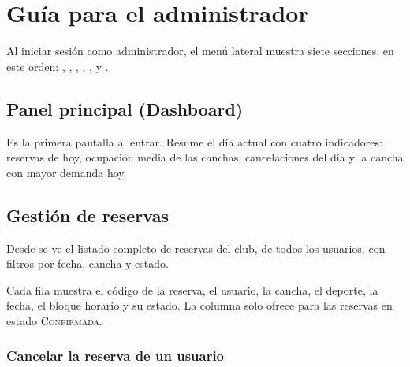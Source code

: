 
\section{Guía para el administrador}
\label{sec:administrador}

Al iniciar sesión como administrador, el menú lateral muestra siete
secciones, en este orden: , ,
, , ,
 y .


\subsection{Panel principal (Dashboard)}
\label{sec:admin:dashboard}

Es la primera pantalla al entrar. Resume el día actual con cuatro
indicadores: reservas de hoy, ocupación media de las canchas,
cancelaciones del día y la cancha con mayor demanda hoy.


\subsection{Gestión de reservas}
\label{sec:admin:reservas}

Desde  se ve el listado completo de reservas del club,
de todos los usuarios, con filtros por fecha, cancha y estado.


Cada fila muestra el código de la reserva, el usuario, la cancha, el
deporte, la fecha, el bloque horario y su estado. La columna
 solo ofrece  para las reservas en estado
\textsc{Confirmada}.

\subsubsection{Cancelar la reserva de un usuario}

